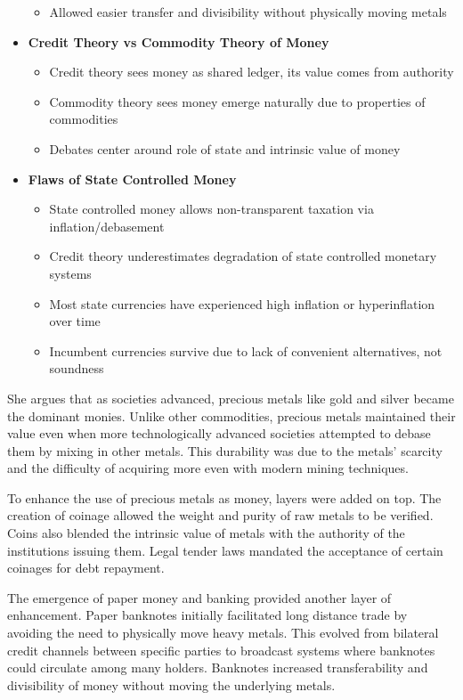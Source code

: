 \begin{itemize}
\begin{itemize}
\item Allowed easier transfer and divisibility without physically moving metals
\end{itemize}
\item \textbf{Credit Theory vs Commodity Theory of Money}
\begin{itemize}
\item Credit theory sees money as shared ledger, its value comes from authority
\item Commodity theory sees money emerge naturally due to properties of commodities
\item Debates center around role of state and intrinsic value of money
\end{itemize}
\item \textbf{Flaws of State Controlled Money}
\begin{itemize}
\item State controlled money allows non-transparent taxation via inflation/debasement
\item Credit theory underestimates degradation of state controlled monetary systems
\item Most state currencies have experienced high inflation or hyperinflation over time
\item Incumbent currencies survive due to lack of convenient alternatives, not soundness
\end{itemize}

\end{itemize}
She argues that as societies advanced, precious metals like gold and silver became the dominant monies. Unlike other commodities, precious metals maintained their value even when more technologically advanced societies attempted to debase them by mixing in other metals. This durability was due to the metals' scarcity and the difficulty of acquiring more even with modern mining techniques.\par

To enhance the use of precious metals as money, layers were added on top. The creation of coinage allowed the weight and purity of raw metals to be verified. Coins also blended the intrinsic value of metals with the authority of the institutions issuing them. Legal tender laws mandated the acceptance of certain coinages for debt repayment.\par

The emergence of paper money and banking provided another layer of enhancement. Paper banknotes initially facilitated long distance trade by avoiding the need to physically move heavy metals. This evolved from bilateral credit channels between specific parties to broadcast systems where banknotes could circulate among many holders. Banknotes increased transferability and divisibility of money without moving the underlying metals.

